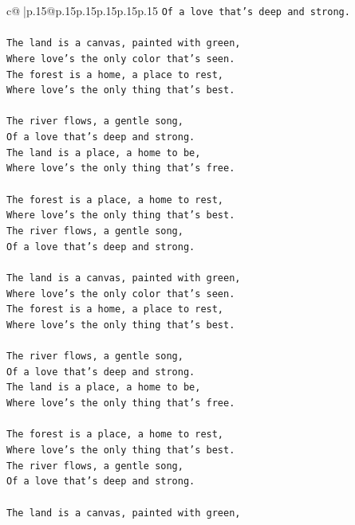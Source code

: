 \documentclass{article}
\begin{document}
{\begin{supertabular}{c@{$\;$}|p{.15\linewidth}@{}p{.15\linewidth}p{.15\linewidth}p{.15\linewidth}p{.15\linewidth}p{.15\linewidth}}
{{{\texttt{Of a love that's deep and strong.} \\
\\ 
\texttt{The land is a canvas, painted with green,} \\
\texttt{Where love's the only color that's seen.} \\
\texttt{The forest is a home, a place to rest,} \\
\texttt{Where love's the only thing that's best.} \\
\\ 
\texttt{The river flows, a gentle song,} \\
\texttt{Of a love that's deep and strong.} \\
\texttt{The land is a place, a home to be,} \\
\texttt{Where love's the only thing that's free.} \\
\\ 
\texttt{The forest is a place, a home to rest,} \\
\texttt{Where love's the only thing that's best.} \\
\texttt{The river flows, a gentle song,} \\
\texttt{Of a love that's deep and strong.} \\
\\ 
\texttt{The land is a canvas, painted with green,} \\
\texttt{Where love's the only color that's seen.} \\
\texttt{The forest is a home, a place to rest,} \\
\texttt{Where love's the only thing that's best.} \\
\\ 
\texttt{The river flows, a gentle song,} \\
\texttt{Of a love that's deep and strong.} \\
\texttt{The land is a place, a home to be,} \\
\texttt{Where love's the only thing that's free.} \\
\\ 
\texttt{The forest is a place, a home to rest,} \\
\texttt{Where love's the only thing that's best.} \\
\texttt{The river flows, a gentle song,} \\
\texttt{Of a love that's deep and strong.} \\
\\ 
\texttt{The land is a canvas, painted with green,} \\
}}}
\end{supertabular}}
\end{document}
